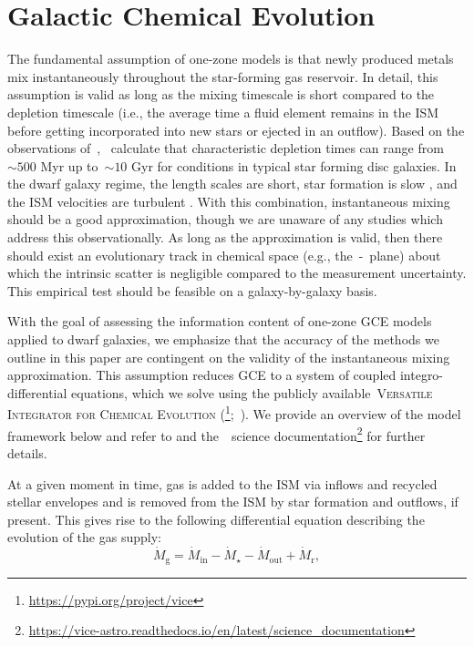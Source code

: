 \documentclass[ms.tex]{subfiles}
\begin{document}
\section{Galactic Chemical Evolution}
\label{sec:onezone}

The fundamental assumption of one-zone models is that newly produced metals mix
instantaneously throughout the star-forming gas reservoir.
In detail, this assumption is valid as long as the mixing timescale is short
compared to the depletion timescale (i.e., the average time a fluid element
remains in the ISM before getting incorporated into new stars or ejected in an
outflow).
Based on the observations of~\citet{Leroy2008},~\citet{Weinberg2017} calculate
that characteristic depletion times can range from~$\sim500$ Myr up to~$\sim10$
Gyr for conditions in typical star forming disc galaxies.
In the dwarf galaxy regime, the length scales are short, star formation is slow
\citep[e.g.,][]{Hudson2015}, and the ISM velocities are turbulent
\citep{Dutta2009, Stilp2013, Schleicher2016}.
With this combination, instantaneous mixing should be a good approximation,
though we are unaware of any studies which address this observationally.
As long as the approximation is valid, then there should exist an evolutionary
track in chemical space (e.g., the~\afe-\feh~plane) about which the intrinsic
scatter is negligible compared to the measurement uncertainty.
This empirical test should be feasible on a galaxy-by-galaxy basis.
\par
With the goal of assessing the information content of one-zone GCE models
applied to dwarf galaxies, we emphasize that the accuracy of the methods we
outline in this paper are contingent on the validity of the instantaneous
mixing approximation.
This assumption reduces GCE to a system of coupled integro-differential
equations, which we solve using the publicly available~\textsc{Versatile
Integrator for Chemical Evolution} (\vice\footnote{
	\url{https://pypi.org/project/vice}
};~\citealp{Johnson2020}).
We provide an overview of the model framework below and refer to
\citet{Johnson2020} and the~\vice~science documentation\footnote{
	\url{https://vice-astro.readthedocs.io/en/latest/science_documentation}
} for further details.
\par
At a given moment in time, gas is added to the ISM via inflows and recycled
stellar envelopes and is removed from the ISM by star formation and outflows,
if present.
This gives rise to the following differential equation describing the evolution
of the gas supply:
\begin{equation}
\dot{M}_\text{g} = \dot{M}_\text{in} - \dot{M}_\star - \dot{M}_\text{out}
+ \dot{M}_\text{r},
\label{eq:mdotgas}
\end{equation}
\end{document}
